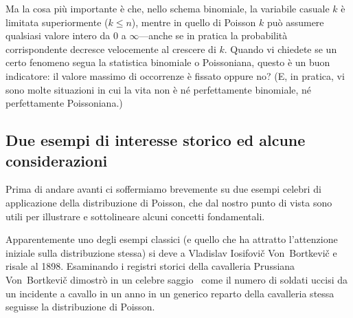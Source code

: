 Ma la cosa più importante è che, nello schema binomiale, la variabile
casuale $k$ è limitata superiormente ($k \leq n$), mentre in quello di Poisson
$k$ può assumere qualsiasi valore intero da $0$ a $\infty$---anche se in
pratica la probabilità corrispondente decresce velocemente al crescere di $k$.
Quando vi chiedete se un certo fenomeno segua la statistica binomiale o
Poissoniana, questo è un buon indicatore: il valore massimo di occorrenze
è fissato oppure no? (E, in pratica, vi sono molte situazioni in cui la vita
non è né perfettamente binomiale, né perfettamente Poissoniana.)


\subsection{Due esempi di interesse storico ed alcune considerazioni}

Prima di andare avanti ci soffermiamo brevemente su due esempi celebri di
applicazione della distribuzione di Poisson, che dal nostro punto di
vista sono utili per illustrare e sottolineare alcuni concetti fondamentali.

Apparentemente uno degli esempi classici (e quello che ha attratto l'attenzione
iniziale sulla distribuzione stessa) si deve a Vladislav Iosifovi\v{c}
Von~Bortkevi\v{c} e risale al 1898. Esaminando i registri storici della
cavalleria Prussiana Von~Bortkevi\v{c} dimostrò in un celebre
saggio~\cite{bortkiewicz} come il numero di soldati uccisi da un incidente a
cavallo in un anno in un generico reparto della cavalleria stessa seguisse
la distribuzione di Poisson.

\begin{table}[!htb]
\end{table}

